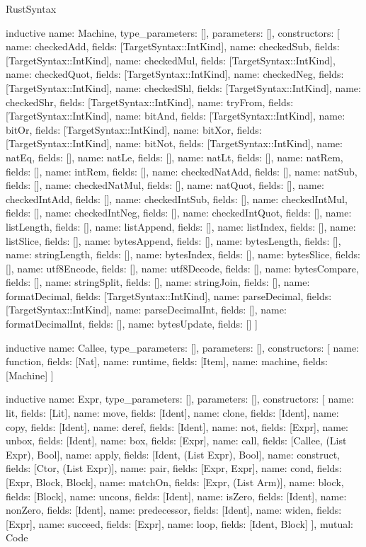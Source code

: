 \begin{lexlean}{RustSyntax}
\begin{semanticmodule}
inductive{
  name: Machine,
  type_parameters: [],
  parameters: [],
  constructors: [
    {name: checkedAdd, fields: [TargetSyntax::IntKind]},
    {name: checkedSub, fields: [TargetSyntax::IntKind]},
    {name: checkedMul, fields: [TargetSyntax::IntKind]},
    {name: checkedQuot, fields: [TargetSyntax::IntKind]},
    {name: checkedNeg, fields: [TargetSyntax::IntKind]},
    {name: checkedShl, fields: [TargetSyntax::IntKind]},
    {name: checkedShr, fields: [TargetSyntax::IntKind]},
    {name: tryFrom, fields: [TargetSyntax::IntKind]},
    {name: bitAnd, fields: [TargetSyntax::IntKind]},
    {name: bitOr, fields: [TargetSyntax::IntKind]},
    {name: bitXor, fields: [TargetSyntax::IntKind]},
    {name: bitNot, fields: [TargetSyntax::IntKind]},
    {name: natEq, fields: []},
    {name: natLe, fields: []},
    {name: natLt, fields: []},
    {name: natRem, fields: []},
    {name: intRem, fields: []},
    {name: checkedNatAdd, fields: []},
    {name: natSub, fields: []},
    {name: checkedNatMul, fields: []},
    {name: natQuot, fields: []},
    {name: checkedIntAdd, fields: []},
    {name: checkedIntSub, fields: []},
    {name: checkedIntMul, fields: []},
    {name: checkedIntNeg, fields: []},
    {name: checkedIntQuot, fields: []},
    {name: listLength, fields: []},
    {name: listAppend, fields: []},
    {name: listIndex, fields: []},
    {name: listSlice, fields: []},
    {name: bytesAppend, fields: []},
    {name: bytesLength, fields: []},
    {name: stringLength, fields: []},
    {name: bytesIndex, fields: []},
    {name: bytesSlice, fields: []},
    {name: utf8Encode, fields: []},
    {name: utf8Decode, fields: []},
    {name: bytesCompare, fields: []},
    {name: stringSplit, fields: []},
    {name: stringJoin, fields: []},
    {name: formatDecimal, fields: [TargetSyntax::IntKind]},
    {name: parseDecimal, fields: [TargetSyntax::IntKind]},
    {name: parseDecimalInt, fields: []},
    {name: formatDecimalInt, fields: []},
    {name: bytesUpdate, fields: []}
  ]
}

inductive{
  name: Callee,
  type_parameters: [],
  parameters: [],
  constructors: [
    {name: function, fields: [Nat]},
    {name: runtime, fields: [Item]},
    {name: machine, fields: [Machine]}
  ]
}

inductive{
  name: Expr,
  type_parameters: [],
  parameters: [],
  constructors: [
    {name: lit, fields: [Lit]},
    {name: move, fields: [Ident]},
    {name: clone, fields: [Ident]},
    {name: copy, fields: [Ident]},
    {name: deref, fields: [Ident]},
    {name: not, fields: [Expr]},
    {name: unbox, fields: [Ident]},
    {name: box, fields: [Expr]},
    {name: call, fields: [Callee, (List Expr), Bool]},
    {name: apply, fields: [Ident, (List Expr), Bool]},
    {name: construct, fields: [Ctor, (List Expr)]},
    {name: pair, fields: [Expr, Expr]},
    {name: cond, fields: [Expr, Block, Block]},
    {name: matchOn, fields: [Expr, (List Arm)]},
    {name: block, fields: [Block]},
    {name: uncons, fields: [Ident]},
    {name: isZero, fields: [Ident]},
    {name: nonZero, fields: [Ident]},
    {name: predecessor, fields: [Ident]},
    {name: widen, fields: [Expr]},
    {name: succeed, fields: [Expr]},
    {name: loop, fields: [Ident, Block]}
  ],
  mutual: Code
}


\end{semanticmodule}
\end{lexlean}
